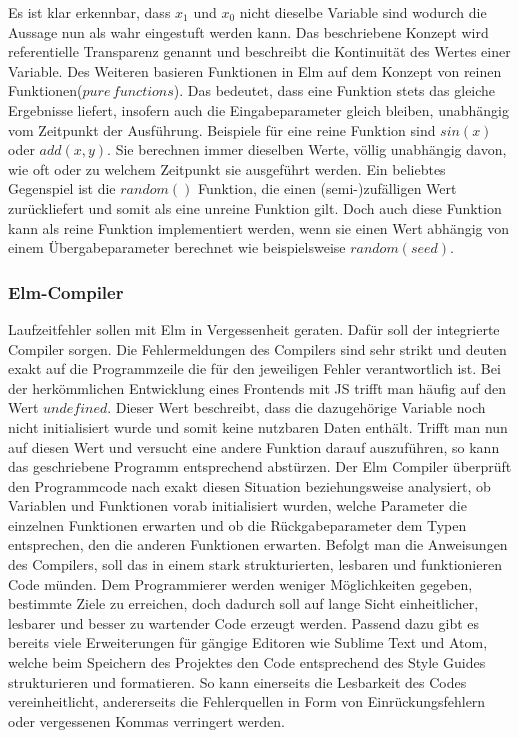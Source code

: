 Es ist klar erkennbar, dass $x_1$ und $x_0$ nicht dieselbe Variable sind wodurch die Aussage nun als wahr eingestuft werden kann. Das beschriebene Konzept wird referentielle Transparenz genannt und beschreibt die Kontinuität des Wertes einer Variable.
Des Weiteren basieren Funktionen in Elm auf dem Konzept von reinen Funktionen($pure\,functions$). Das bedeutet, dass eine Funktion stets das gleiche Ergebnisse liefert, insofern auch die Eingabeparameter gleich bleiben, unabhängig vom Zeitpunkt der Ausführung. Beispiele für eine reine Funktion sind $sin(x)$ oder $add(x, y)$. Sie berechnen immer dieselben Werte, völlig unabhängig davon, wie oft oder zu welchem Zeitpunkt sie ausgeführt werden. Ein beliebtes Gegenspiel ist die $random()$ Funktion, die einen (semi-)zufälligen Wert zurückliefert und somit als eine unreine Funktion gilt. Doch auch diese Funktion kann als reine Funktion implementiert werden, wenn sie einen Wert abhängig von einem Übergabeparameter berechnet wie beispielsweise $random(seed)$.

\subsubsection{Elm-Compiler}
\label{sec:Elm-Compiler}
Laufzeitfehler sollen mit Elm in Vergessenheit geraten. Dafür soll der integrierte Compiler sorgen. Die Fehlermeldungen des Compilers sind sehr strikt und deuten exakt auf die Programmzeile die für den jeweiligen Fehler verantwortlich ist. Bei der herkömmlichen Entwicklung eines Frontends mit \ac{JS} trifft man häufig auf den Wert $undefined$. Dieser Wert beschreibt, dass die dazugehörige Variable noch nicht initialisiert wurde und somit keine nutzbaren Daten enthält. Trifft man nun auf diesen Wert und versucht eine andere Funktion darauf auszuführen, so kann das geschriebene Programm entsprechend abstürzen. Der Elm Compiler überprüft den Programmcode nach exakt diesen Situation beziehungsweise analysiert, ob Variablen und Funktionen vorab initialisiert wurden, welche Parameter die einzelnen Funktionen erwarten und ob die Rückgabeparameter dem Typen entsprechen, den die anderen Funktionen erwarten. Befolgt man die Anweisungen des Compilers, soll das in einem stark strukturierten, lesbaren und funktionieren Code münden.
Dem Programmierer werden weniger Möglichkeiten gegeben, bestimmte Ziele zu erreichen, doch dadurch soll auf lange Sicht einheitlicher, lesbarer und besser zu wartender Code erzeugt werden. Passend dazu gibt es bereits viele Erweiterungen für gängige Editoren wie Sublime Text und Atom, welche beim Speichern des Projektes den Code entsprechend des Style Guides strukturieren und formatieren. So kann einerseits die Lesbarkeit des Codes vereinheitlicht, andererseits die Fehlerquellen in Form von Einrückungsfehlern oder vergessenen Kommas verringert werden.

